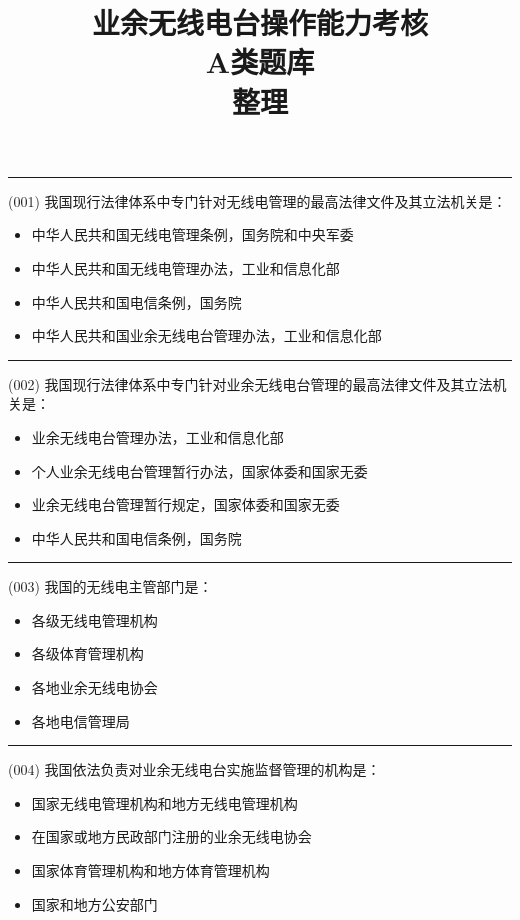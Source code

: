 \documentclass[twocolumn]{ctexart}  %
\title{业余无线电台操作能力考核\\A类题库\\整理}
\begin{document}
\maketitle


\noindent\rule{0.5\textwidth}{1pt}
\heiti (001) 我国现行法律体系中专门针对无线电管理的最高法律文件及其立法机关是： \songti {\color{gray} [LK0001] }
\begin{itemize}
	\item  中华人民共和国无线电管理条例，国务院和中央军委
	\item  中华人民共和国无线电管理办法，工业和信息化部
	\item  中华人民共和国电信条例，国务院
	\item  中华人民共和国业余无线电台管理办法，工业和信息化部
\end{itemize}


\noindent\rule{0.5\textwidth}{1pt}
\heiti (002) 我国现行法律体系中专门针对业余无线电台管理的最高法律文件及其立法机关是： \songti {\color{gray} [LK0002] }
\begin{itemize}
	\item  业余无线电台管理办法，工业和信息化部
	\item  个人业余无线电台管理暂行办法，国家体委和国家无委
	\item  业余无线电台管理暂行规定，国家体委和国家无委
	\item  中华人民共和国电信条例，国务院
\end{itemize}


\noindent\rule{0.5\textwidth}{1pt}
\heiti (003) 我国的无线电主管部门是： \songti {\color{gray} [LK0003] }
\begin{itemize}
	\item  各级无线电管理机构
	\item  各级体育管理机构
	\item  各地业余无线电协会
	\item  各地电信管理局
\end{itemize}


\noindent\rule{0.5\textwidth}{1pt}
\heiti (004) 我国依法负责对业余无线电台实施监督管理的机构是： \songti {\color{gray} [LK0004] }
\begin{itemize}
	\item  国家无线电管理机构和地方无线电管理机构
	\item  在国家或地方民政部门注册的业余无线电协会
	\item  国家体育管理机构和地方体育管理机构
	\item  国家和地方公安部门
\end{itemize}
\end{document}
